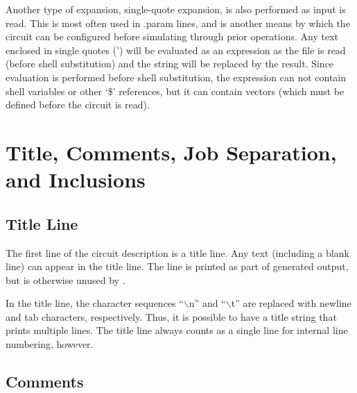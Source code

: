 
Another type of expansion, single-quote expansion, is also performed
as input is read.  This is most often used in {\vt .param} lines, and
is another means by which the circuit can be configured before
simulating through prior {\WRspice} operations.  Any text enclosed in
single quotes (') will be evaluated as an expression as the file is
read (before shell substitution) and the string will be replaced by
the result.  Since evaluation is performed before shell substitution,
the expression can not contain shell variables or other `{\vt \$}'
references, but it can contain vectors (which must be defined before
the circuit is read).


\section{Title, Comments, Job Separation, and Inclusions}


\subsection{Title Line}
The first line of the circuit description is a title line.  Any text
(including a blank line) can appear in the title line.  The line is
printed as part of generated output, but is otherwise unused by
{\WRspice}.

In the title line, the character sequences ``{\vt $\backslash$n}'' and
``{\vt $\backslash$t}'' are replaced with newline and tab characters,
respectively.  Thus, it is possible to have a title string that prints
multiple lines.  The title line always counts as a single line for
internal line numbering, however.

\subsection{Comments}


